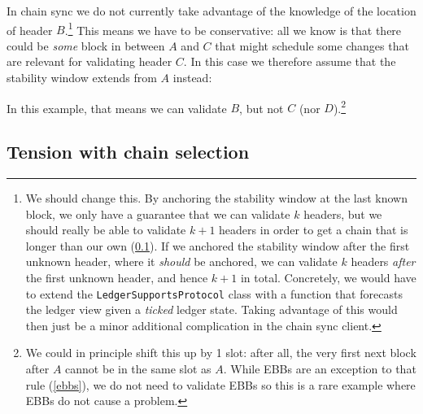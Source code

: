 In chain sync we do not currently take advantage of the knowledge of the
location of header $B$.\footnote{\label{footnote:anchor-after-first-header}We
should change this. By anchoring the stability window at the last known block,
we only have a guarantee that we can validate $k$ headers, but we should really
be able to validate $k + 1$ headers in order to get a chain that is longer than
our own (\cref{low-density:tension}). If we anchored the stability window after
the first unknown header, where it \emph{should} be anchored, we can validate
$k$ headers \emph{after} the first unknown header, and hence $k + 1$ in total.
Concretely, we would have to extend the \lstinline!LedgerSupportsProtocol! class
with a function that forecasts the ledger view given a \emph{ticked} ledger
state. Taking advantage of this would then just be a minor additional
complication in the chain sync client.}  This means we have to be conservative:
all we know is that there could be \emph{some} block in between $A$ and $C$ that
might schedule some changes that are relevant for validating header $C$. In this
case we therefore assume that the stability window extends from $A$ instead:
%
\begin{center}
\end{center}
%
In this example, that means we can validate $B$, but not $C$ (nor
$D$).\footnote{We could in principle shift this up by 1 slot: after all, the
very first next block after $A$ cannot be in the same slot as $A$. While EBBs
are an exception to that rule (\cref{ebbs}), we do not need to validate EBBs so
this is a rare example where EBBs do not cause a problem.}

\subsection{Tension with chain selection}
\label{low-density:tension}

